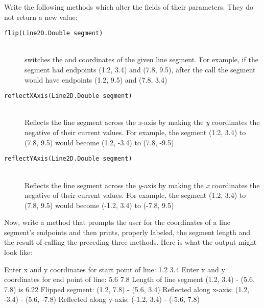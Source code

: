 \begin{exercise}
\begin{description}
\end{description}

Write the following  methods which alter the fields of their parameters. They do not return a new value: 

\begin{description}
  \item[\texttt{flip(Line2D.Double segment)}] \hfill \\ switches the  and  coordinates of the given line segment. For example, if the segment had endpoints (1.2, 3.4) and (7.8, 9.5), after the call the segment would have endpoints (1.2, 9.5) and (7.8, 3.4)
  \item[\texttt{reflectXAxis(Line2D.Double segment)}] \hfill \\ Reflects the line segment across the {\em x}-axis by making the {\em y} coordinates the negative of their current values. For example, the segment (1.2, 3.4) to (7.8, 9.5) would become (1.2, -3.4) to (7.8, -9.5)
  \item[\texttt{reflectYAxis(Line2D.Double segment)}] \hfill \\ Reflects the line segment across the {\em y}-axis by making the {\em x} coordinates the negative of their current values. For example, the segment (1.2, 3.4) to (7.8, 9.5) would become (-1.2, 3.4) to (-7.8, 9.5)
\end{description}

Now, write a  method that prompts the user for the coordinates of a line segment's endpoints and then prints, properly labeled, the segment length and the result of calling the preceding three methods. Here is what the output might look like:

\begin{stdout}
Enter x and y coordinates for start point of line: 1.2 3.4
Enter x and y coordinates for end point of line: 5.6 7.8
Length of line segment (1.2, 3.4) - (5.6, 7.8) is 6.22
Flipped segment: (1.2, 7.8) - (5.6, 3.4)
Reflected along x-axis: (1.2, -3.4) - (5.6, -7.8)
Reflected along y-axis: (-1.2, 3.4) - (-5.6, 7.8)
\end{stdout}

\end{exercise}

